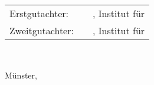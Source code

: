 \begin{centering}
{\sffamily
	\begin{tabular}{lp{0.5cm}l}
		Erstgutachter:& &\tReviewer, Institut für \tReviewerInstitute \\	Zweitgutachter:& &\tSecondReviewer, Institut für \tSecondReviewerInstitute
	\end{tabular}
	\\[1.5cm]
}

{\sffamily
Münster, 
}
\vfill
\end{centering}
\restoregeometry